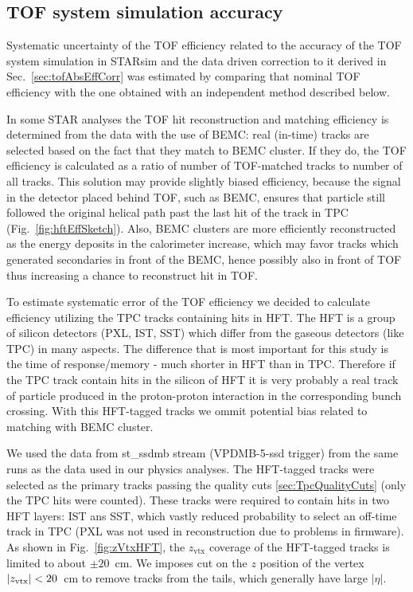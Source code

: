\subsection{TOF system simulation accuracy}\label{subsec:tofAbsEffSystAndCorr}

Systematic uncertainty of the TOF efficiency related to the accuracy of the TOF system simulation in STARsim and the data driven correction to it derived in Sec.~\ref{sec:tofAbsEffCorr} was estimated by comparing that nominal TOF efficiency with the one obtained with an independent method described below.

In some STAR analyses the TOF hit reconstruction and matching efficiency is determined from the data with the use of BEMC: real (in-time) tracks are selected based on the fact that they match to BEMC cluster. If they do, the TOF efficiency is calculated as a ratio of number of TOF-matched tracks to number of all tracks. This solution may provide slightly biased efficiency, because the signal in the detector placed behind TOF, such as BEMC, ensures that particle still followed the original helical path past the last hit of the track in TPC (Fig.~\ref{fig:hftEffSketch}). Also, BEMC clusters are more efficiently reconstructed as the energy deposits in the calorimeter increase, which may favor tracks which generated secondaries in front of the BEMC, hence possibly also in front of TOF thus increasing a chance to reconstruct hit in TOF.

To estimate systematic error of the TOF efficiency we decided to calculate efficiency utilizing the TPC tracks containing hits in HFT. The HFT is a group of silicon detectors (PXL, IST, SST) which differ from the gaseous detectors (like TPC) in many aspects. The difference that is most important for this study is the time of response/memory - much shorter in HFT than in TPC. Therefore if the TPC track contain hits in the silicon of HFT it is very probably a real track of particle produced in the proton-proton interaction in the corresponding bunch crossing. With this HFT-tagged tracks we ommit potential bias related to matching with BEMC cluster.

We used the data from st\_ssdmb stream (VPDMB-5-ssd trigger) from the same runs as the data used in our physics analyses. The HFT-tagged tracks were selected as the primary tracks passing the quality cuts \ref{sec:TpcQualityCuts} (only the TPC hits were counted). These tracks were required to contain hits in two HFT layers: IST ans SST, which vastly reduced probability to select an off-time track in TPC (PXL was not used in reconstruction due to problems in firmware). As shown in Fig.~\ref{fig:zVtxHFT}, the $z_{\text{vtx}}$ coverage of the HFT-tagged tracks is limited to about $\pm20$~cm. We imposes cut on the $z$ position of the vertex $|z_{\text{\text{vtx}}}|<20$~cm to remove tracks from the tails, which generally have large $|\eta|$.


